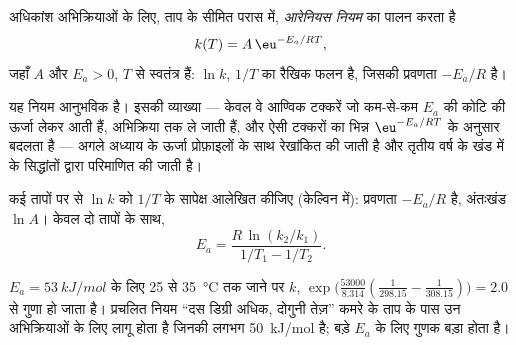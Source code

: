 \begin{theorem}[आरेनियस नियम]\label{thm:b1:rate-laws:arrhenius}
अधिकांश अभिक्रियाओं के लिए, ताप के सीमित परास में,  \emph{आरेनियस नियम} का पालन करता है
\[
  k(T) = A\,\eu^{-E_a/RT} ,
\]
जहाँ $A$ और $E_a > 0$, $T$ से स्वतंत्र हैं: $\ln k$, $1/T$ का
रैखिक फलन है, जिसकी प्रवणता $-E_a/R$ है।
\end{theorem}
\admitted

\begin{remark}[$E_a$ का अर्थ]\label{rem:b1:rate-laws:meaning}
यह नियम आनुभविक है। इसकी व्याख्या --- केवल वे आण्विक टक्करें
जो कम-से-कम $E_a$ की कोटि की ऊर्जा लेकर आती हैं, अभिक्रिया तक ले जाती हैं, और
ऐसी टक्करों का भिन्न $\eu^{-E_a/RT}$ के अनुसार बदलता है --- अगले अध्याय के
ऊर्जा प्रोफ़ाइलों के साथ रेखांकित की जाती है और तृतीय वर्ष के खंड में  के सिद्धांतों द्वारा परिमाणित की जाती है।
\end{remark}

\begin{method}[$E_a$ ज्ञात करना]\label{met:b1:rate-laws:arrhenius-plot}
कई तापों पर  से $\ln k$ को $1/T$ के सापेक्ष आलेखित कीजिए
(केल्विन में): प्रवणता $-E_a/R$ है, अंतःखंड $\ln A$। केवल दो
तापों के साथ,
\[
  E_a = \frac{R\,\ln(k_2/k_1)}{1/T_1 - 1/T_2} .
\]
\end{method}

\begin{example}[एक मोटा नियम]\label{ex:b1:rate-laws:doubling}
$E_a = \qty{53}{kJ/mol}$ के लिए 25 से \qty{35}{\celsius} तक जाने पर
$k$, $\exp\!\big(\frac{53000}{8.314}(\frac{1}{298.15} -
\frac{1}{308.15})\big) = 2.0$ से गुणा हो जाता है। प्रचलित नियम ``दस डिग्री अधिक, दोगुनी
तेज़'' कमरे के ताप के पास उन अभिक्रियाओं के लिए लागू होता है जिनकी 
लगभग \qty{50}{kJ/mol} है; बड़े $E_a$ के लिए गुणक बड़ा होता है।
\end{example}

